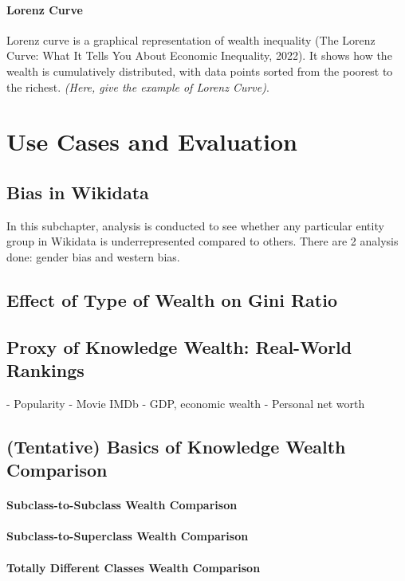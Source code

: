 \documentclass[
]{ceurart}
\begin{document}
\paragraph{Lorenz Curve} Lorenz curve is a graphical representation of wealth inequality (The Lorenz Curve: What It Tells You About Economic Inequality, 2022). It shows how the wealth is cumulatively distributed, with data points sorted from the poorest to the richest. \textit{(Here, give the example of Lorenz Curve)}. 


\section{Use Cases and Evaluation}

\subsection{Bias in Wikidata}
In this subchapter, analysis is conducted to see whether any particular entity group in Wikidata is underrepresented compared to others. There are 2 analysis done: gender bias and western bias.



\subsection{Effect of Type of Wealth on Gini Ratio}


\subsection{Proxy of Knowledge Wealth: Real-World Rankings}
- Popularity
- Movie IMDb
- GDP, economic wealth
- Personal net worth

\subsection{(Tentative) Basics of Knowledge Wealth Comparison}

\paragraph{Subclass-to-Subclass Wealth Comparison}
\paragraph{Subclass-to-Superclass Wealth Comparison}
\paragraph{Totally Different Classes Wealth Comparison}
\end{document}
